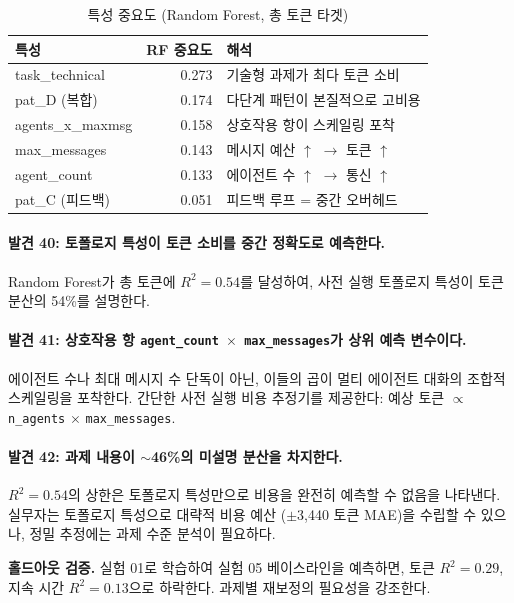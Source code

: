 \documentclass[a4paper,11pt]{article}
\begin{document}
\begin{table}[H]
\centering
\caption{특성 중요도 (Random Forest, 총 토큰 타겟)}
\label{tab:feature-importance}
{\small
\begin{tabular}{lrl}
\toprule
특성 & RF 중요도 & 해석 \\
\midrule
task\_technical     & 0.273 & 기술형 과제가 최다 토큰 소비 \\
pat\_D (복합)       & 0.174 & 다단계 패턴이 본질적으로 고비용 \\
agents\_x\_maxmsg   & 0.158 & 상호작용 항이 스케일링 포착 \\
max\_messages       & 0.143 & 메시지 예산 $\uparrow$ $\to$ 토큰 $\uparrow$ \\
agent\_count        & 0.133 & 에이전트 수 $\uparrow$ $\to$ 통신 $\uparrow$ \\
pat\_C (피드백)     & 0.051 & 피드백 루프 = 중간 오버헤드 \\
\bottomrule
\end{tabular}
}
\end{table}

\paragraph{발견 40: 토폴로지 특성이 토큰 소비를 중간 정확도로 예측한다.}
Random Forest가 총 토큰에 $R^{2}=0.54$를 달성하여, 사전 실행 토폴로지 특성이 토큰 분산의 54\%를 설명한다.

\paragraph{발견 41: 상호작용 항 \texttt{agent\_count $\times$ max\_messages}가 상위 예측 변수이다.}
에이전트 수나 최대 메시지 수 단독이 아닌, 이들의 곱이 멀티 에이전트 대화의 조합적 스케일링을 포착한다. 간단한 사전 실행 비용 추정기를 제공한다: 예상 토큰 $\propto$ \texttt{n\_agents} $\times$ \texttt{max\_messages}.

\paragraph{발견 42: 과제 내용이 $\sim$46\%의 미설명 분산을 차지한다.}
$R^{2}=0.54$의 상한은 토폴로지 특성만으로 비용을 완전히 예측할 수 없음을 나타낸다. 실무자는 토폴로지 특성으로 대략적 비용 예산 ($\pm$3,440 토큰 MAE)을 수립할 수 있으나, 정밀 추정에는 과제 수준 분석이 필요하다.

\textbf{홀드아웃 검증.} 실험 01로 학습하여 실험 05 베이스라인을 예측하면, 토큰 $R^{2}=0.29$, 지속 시간 $R^{2}=0.13$으로 하락한다. 과제별 재보정의 필요성을 강조한다.
\end{document}
